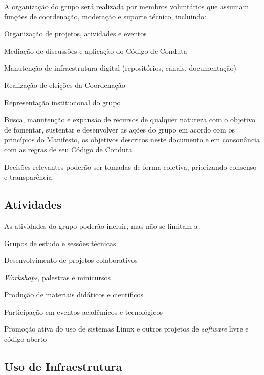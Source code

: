 \documentclass[
  12pt,          %
  a4paper,       %
  oneside,       %
  brazil         %
]{article}
\begin{document}
A organização do grupo será realizada por membros voluntários que assumam funções de coordenação, moderação e suporte técnico, incluindo:

\begin{conduta}
  \item Organização de projetos, atividades e eventos
  \item Mediação de discussões e aplicação do Código de Conduta
  \item Manutenção de infraestrutura digital (repositórios, canais, documentação)
  \item Realização de eleições da Coordenação
  \item Representação institucional do grupo
  \item Busca, manutenção e expansão de recursos de qualquer natureza com o objetivo de fomentar, sustentar e desenvolver as ações do grupo 
  em acordo com os princípios do Manifesto, os objetivos descritos neste documento e em consonância com as regras de seu Código de Conduta
\end{conduta}

Decisões relevantes poderão ser tomadas de forma coletiva, priorizando consenso e transparência.

\subsection{Atividades}

As atividades do grupo poderão incluir, mas não se limitam a:

\begin{conduta}
  \item Grupos de estudo e sessões técnicas
  \item Desenvolvimento de projetos colaborativos
  \item \textit{Workshops}, palestras e minicursos
  \item Produção de materiais didáticos e científicos
  \item Participação em eventos acadêmicos e tecnológicos
  \item Promoção ativa do uso de sistemas Linux e outros projetos de \textit{software} livre e código aberto
\end{conduta}

\subsection{Uso de Infraestrutura}
\end{document}
